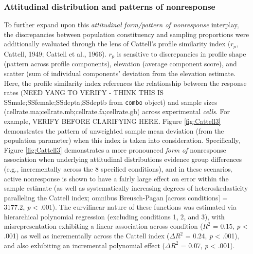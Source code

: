 \documentclass[
  man,mask]{apa7}
\begin{document}
\subsubsection{Attitudinal distribution and patterns of nonresponse}\label{attitudinal-distribution-and-patterns-of-nonresponse}

To further expand upon this \emph{attitudinal form/pattern of nonresponse} interplay, the discrepancies between population constituency and sampling proportions were additionally evaluated through the lens of Cattell's profile similarity index (\(r_p\), Cattell, 1949; Cattell et al., 1966). \(r_p\) is sensitive to discrepancies in profile shape (pattern across profile components), elevation (average component score), and scatter (sum of individual components' deviation from the elevation estimate. Here, the profile similarity index references the relationship between the response rates (NEED YANG TO VERIFY - THINK THIS IS SSmale;SSfemale;SSdepta;SSdeptb from \texttt{combo} object) and sample sizes (cellrate.ma;cellrate.mb;cellrate.fa;cellrate.gb) across experimental \emph{cells}. For example, VERIFY BEFORE CLARIFYING HERE. Figure \ref{fig:Cattell3} demonstrates the pattern of unweighted sample mean deviation (from the population parameter) when this index is taken into consideration. Specifically, Figure \ref{fig:Cattell3} demonstrates a more pronounced \emph{form of} nonresponse association when underlying attitudinal distributions evidence group differences (e.g., incrementally across the 8 specified conditions), and in these scenarios, active nonresponse is shown to have a fairly large effect on error within the sample estimate (as well as systematically increasing degrees of heteroskedasticity paralleling the Cattell index; omnibus Breusch-Pagan {[}across conditions{]} = 3177.2, \emph{p} \textless{} .001). The curvilinear nature of these functions was estimated via hierarchical polynomial regression (excluding conditions 1, 2, and 3), with misrepresentation exhibiting a linear association across condition (\(R^2\) = 0.15, \emph{p} \textless{} .001) as well as incrementally across the Cattell index (\(\Delta{R^2}\) = 0.24, \emph{p} \textless{} .001), and also exhibiting an incremental polynomial effect (\(\Delta{R^2}\) = 0.07, \emph{p} \textless{} .001).
\end{document}
